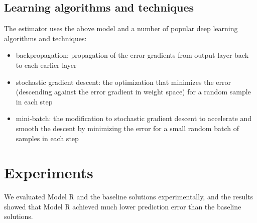 \documentclass[letterpaper]{article}
\begin{document}
\subsection{Learning algorithms and techniques}
The estimator uses the above model and a number of popular deep learning 
algorithms and techniques:
\begin{itemize}
	\item backpropagation: propagation of the error gradients from output layer 
	back to each earlier layer \citeauthor{rumelhart1988learning}
	\item stochastic gradient descent: the optimization that minimizes 
	the error (descending against the error gradient in weight space) for a 
	random sample in each step \citeauthor{lecun2012efficient}
	\item mini-batch: the modification to stochastic gradient descent to 
	accelerate and smooth the descent by minimizing the error for a small 
	random batch of samples in each step \citeauthor{mairal2010online}
\end{itemize}

\section{Experiments}
We evaluated Model R and the baseline solutions experimentally,
and the results showed that Model R achieved much lower prediction error than 
the baseline solutions.
\end{document}

